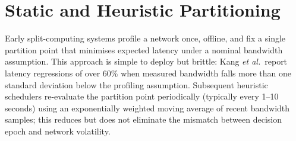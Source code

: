 \section{Static and Heuristic Partitioning}

Early split-computing systems profile a network once, offline, and fix a single partition point that minimises expected latency under a nominal bandwidth assumption. This approach is simple to deploy but brittle: Kang \emph{et al.}\ report latency regressions of over 60\% when measured bandwidth falls more than one standard deviation below the profiling assumption. Subsequent heuristic schedulers re-evaluate the partition point periodically (typically every 1--10 seconds) using an exponentially weighted moving average of recent bandwidth samples; this reduces but does not eliminate the mismatch between decision epoch and network volatility.
